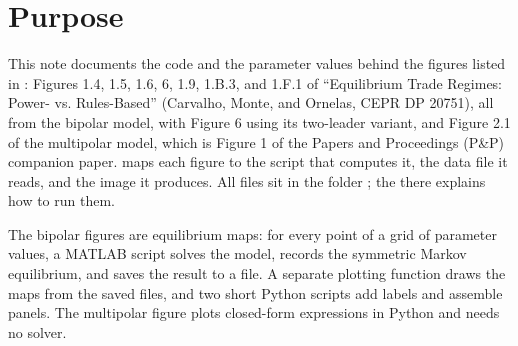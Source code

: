 \section{Purpose}
\label{sec:purpose}

This note documents the code and the parameter values behind the figures
listed in : Figures 1.4, 1.5, 1.6, 6, 1.9, 1.B.3,
and 1.F.1 of ``Equilibrium Trade Regimes: Power- vs. Rules-Based'' (Carvalho,
Monte, and Ornelas, CEPR DP 20751), all from the bipolar model, with Figure 6
using its two-leader variant, and Figure 2.1 of the multipolar model, which
is Figure 1 of the Papers and Proceedings (P\&P) companion paper.  maps each figure to the script that computes it, the
data file it reads, and the image it produces. All files sit in the folder
; the  there explains how to run them.

The bipolar figures are equilibrium maps: for every point of a grid of
parameter values, a MATLAB script solves the model, records the symmetric
Markov equilibrium, and saves the result to a  file. A separate
plotting function draws the maps from the saved files, and two short Python
scripts add labels and assemble panels. The multipolar figure plots
closed-form expressions in Python and needs no solver.

